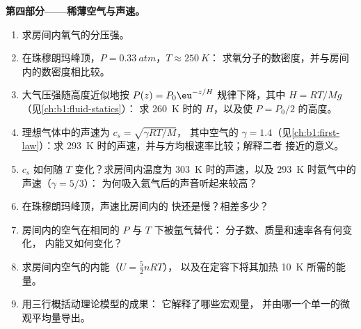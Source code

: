 \begin{problem}
\medskip
\noindent\textbf{第四部分——稀薄空气与声速。}
\begin{enumerate}[resume]
  \item 求房间内氧气的分压强。
  \item 在珠穆朗玛峰顶，$P = \qty{0.33}{atm}$，$T \approx \qty{250}{K}$：
        求氧分子的数密度，并与房间内的数密度相比较。
  \item 大气压强随高度近似地按
        $P(z) = P_0\eu^{-z/H}$ 规律下降，其中 $H = RT/Mg$（见\cref{ch:b1:fluid-statics}）：
        求 \qty{260}{K} 时的 $H$，以及使 $P = P_0/2$ 的高度。
  \item 理想气体中的声速为 $c_s = \sqrt{\gamma RT/M}$，
        其中空气的 $\gamma = 1.4$（见\cref{ch:b1:first-law}）：求
        \qty{293}{K} 时的声速，并与方均根速率比较；解释二者
        接近的意义。
  \item $c_s$ 如何随 $T$ 变化？求房间内温度为
        \qty{303}{K} 时的声速，以及 \qty{293}{K} 时氦气中的声速（$\gamma = 5/3$）：
        为何吸入氦气后的声音听起来较高？
  \item 在珠穆朗玛峰顶，声速比房间内的
        快还是慢？相差多少？
  \item 房间内的空气在相同的 $P$ 与 $T$ 下被氩气替代：
        分子数、质量和速率各有何变化，
        内能又如何变化？
  \item 求房间内空气的内能（$U = \tfrac52 nRT$），
        以及在定容下将其加热 \qty{10}{K} 所需的能量。
  \item 用三行概括动理论模型的成果：
        它解释了哪些宏观量，
        并由哪一个单一的微观平均量导出。
\end{enumerate}
\end{problem}
